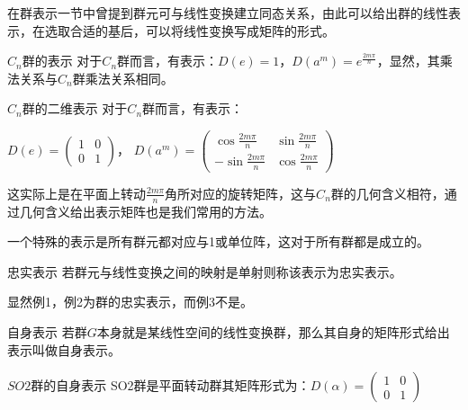 \begin{issues}
\issueDraft
\end{issues}
在群表示一节中曾提到群元可与线性变换建立同态关系，由此可以给出群的线性表示，在选取合适的基后，可以将线性变换写成矩阵的形式。

\begin{example}{$C_n$群的表示}
对于$C_n$群而言，有表示：$D(e)=1$，$D(a^m)=e^{\frac{2m\pi}{n}}$，显然，其乘法关系与$C_n$群乘法关系相同。
\label{gprep_ex1}
\end{example}

\begin{example}{$C_n$群的二维表示}
对于$C_n$群而言，有表示：

$D(e)=\begin{pmatrix}
 1 & 0\\
 0 &1
\end{pmatrix}$，
$D(a^m)=\begin{pmatrix}
 \cos{\frac{2m\pi}{n}} & \sin{\frac{2m\pi}{n}}\\
 -\sin{\frac{2m\pi}{n}} &\cos{\frac{2m\pi}{n}}
\end{pmatrix}$

这实际上是在平面上转动$\frac{2m\pi}{n}$角所对应的旋转矩阵，这与$C_n$群的几何含义相符，通过几何含义给出表示矩阵也是我们常用的方法。
\end{example}

\begin{example}{}
一个特殊的表示是所有群元都对应与1或单位阵，这对于所有群都是成立的。
\label{gprep_ex3}
\end{example}

\begin{definition}{忠实表示}
若群元与线性变换之间的映射是单射则称该表示为忠实表示。
\end{definition}

显然例1，例2为群的忠实表示，而例3不是。

\begin{definition}{自身表示}
若群$G$本身就是某线性空间的线性变换群，那么其自身的矩阵形式给出表示叫做自身表示。
\end{definition}
\begin{example}{$SO2$群的自身表示}
SO2群是平面转动群其矩阵形式为：$D(\alpha)=\begin{pmatrix}
 1 & 0\\
 0 &1
\end{pmatrix}$


\end{example}